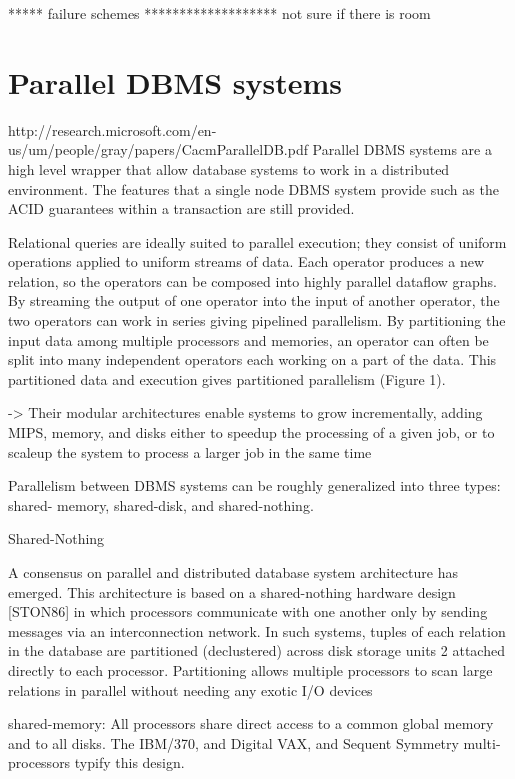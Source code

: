\documentclass[10pt,twocolumn]{IEEEtran11}
\begin{document}
***** failure schemes *******************
not sure if there is room


\section{Parallel DBMS systems}
http://research.microsoft.com/en-us/um/people/gray/papers/CacmParallelDB.pdf
Parallel DBMS systems are a high level wrapper that allow database systems to work in a distributed environment.  The features that a single node DBMS system provide such as the ACID guarantees within a transaction are still provided.  


Relational queries are
ideally suited to parallel execution; they consist of uniform operations applied to uniform streams
of data. Each operator produces a new relation, so the operators can be composed into highly
parallel dataflow graphs. By streaming the output of one operator into the input of another
operator, the two operators can work in series giving pipelined parallelism. By partitioning the
input data among multiple processors and memories, an operator can often be split into many
independent operators each working on a part of the data. This partitioned data and execution
gives partitioned parallelism (Figure 1).


-> Their modular architectures
enable systems to grow incrementally, adding MIPS, memory, and disks either to speedup the
processing of a given job, or to scaleup the system to process a larger job in the same time


Parallelism between DBMS systems can be roughly generalized into three types: shared- memory, shared-disk, and shared-nothing.




Shared-Nothing

A consensus on parallel and distributed database system architecture has emerged. This
architecture is based on a shared-nothing hardware design [STON86] in which processors
communicate with one another only by sending messages via an interconnection network. In
such systems, tuples of each relation in the database are partitioned (declustered) across disk
storage units
2 attached directly to each processor. Partitioning allows multiple processors to scan
large relations in parallel without needing any exotic I/O devices


shared-memory: All processors share direct access to a common global memory and to all
disks. The IBM/370, and Digital VAX, and Sequent Symmetry multi-processors typify this
design.
\end{document}
